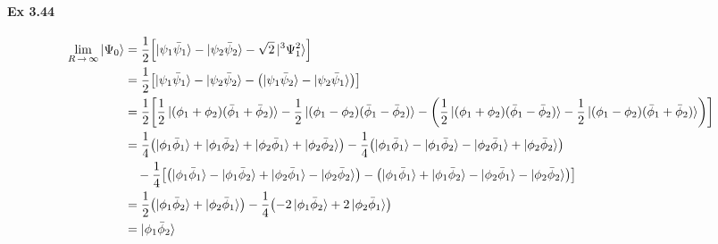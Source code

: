 \documentclass[a4paper]{article}
\DeclareMathOperator{\ra}{\rightarrow}
\newcommand{\ex}[1]{\paragraph{Ex #1}}
\numberwithin{equation}{subsection}
\begin{document}
\ex{3.44}
\begin{align}
\lim\limits_{R\ra\infty} \ket{\Psi_0} &= \dfrac{1}{2}\qty[\ket{\psi_1\bar{\psi}_1} - \ket{\psi_2\bar{\psi}_2} - {\sqrt{2}}\ket{^3\Psi_1^2}] \notag\\
&= \dfrac{1}{2}\qty[\ket{\psi_1\bar{\psi}_1} - \ket{\psi_2\bar{\psi}_2} - \qty(\ket{\psi_1\bar{\psi}_2} - \ket{\psi_2\bar{\psi}_1})] \notag\\
&= \dfrac{1}{2}\qty[\dfrac{1}{2}\ket{(\phi_1 + \phi_2)(\bar\phi_1 + \bar\phi_2)} 
- \dfrac{1}{2}\ket{(\phi_1 - \phi_2)(\bar\phi_1 - \bar\phi_2)} 
- \qty(\dfrac{1}{2}\ket{(\phi_1 + \phi_2)(\bar\phi_1 - \bar\phi_2)} 
- \dfrac{1}{2}\ket{(\phi_1 - \phi_2)(\bar\phi_1 + \bar\phi_2)})] \notag\\
&=\dfrac{1}{4}\qty(\ket{\phi_1\bar\phi_1} + \ket{\phi_1\bar\phi_2}  
+ \ket{\phi_2\bar\phi_1} + \ket{\phi_2\bar\phi_2} ) - \dfrac{1}{4}\qty(\ket{\phi_1\bar\phi_1} - \ket{\phi_1\bar\phi_2}  
- \ket{\phi_2\bar\phi_1} + \ket{\phi_2\bar\phi_2} ) \notag\\
&\quad{} - \dfrac{1}{4}\qty[\qty(\ket{\phi_1\bar\phi_1} - \ket{\phi_1\bar\phi_2}  
+ \ket{\phi_2\bar\phi_1} - \ket{\phi_2\bar\phi_2} )
- \qty(\ket{\phi_1\bar\phi_1} + \ket{\phi_1\bar\phi_2}  
- \ket{\phi_2\bar\phi_1} - \ket{\phi_2\bar\phi_2} )] \notag\\
&= \dfrac{1}{2}\qty(\ket{\phi_1\bar\phi_2}  + \ket{\phi_2\bar\phi_1} )
- \dfrac{1}{4}\qty(- 2\ket{\phi_1\bar\phi_2} + 2\ket{\phi_2\bar\phi_1}) \notag\\
&= \ket{\phi_1\bar\phi_2} 
\end{align}
\end{document}
